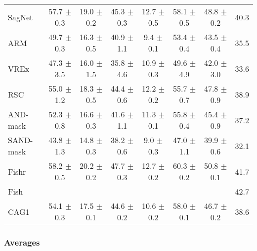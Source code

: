 \documentclass{article}
\begin{document}
\begin{center}
{\begin{tabular}{lccccccc}
SagNet               & 57.7 $\pm$ 0.3       & 19.0 $\pm$ 0.2       & 45.3 $\pm$ 0.3       & 12.7 $\pm$ 0.5       & 58.1 $\pm$ 0.5       & 48.8 $\pm$ 0.2       & 40.3                 \\
ARM                  & 49.7 $\pm$ 0.3       & 16.3 $\pm$ 0.5       & 40.9 $\pm$ 1.1       & 9.4 $\pm$ 0.1        & 53.4 $\pm$ 0.4       & 43.5 $\pm$ 0.4       & 35.5                 \\
VREx                 & 47.3 $\pm$ 3.5       & 16.0 $\pm$ 1.5       & 35.8 $\pm$ 4.6       & 10.9 $\pm$ 0.3       & 49.6 $\pm$ 4.9       & 42.0 $\pm$ 3.0       & 33.6                 \\
RSC                  & 55.0 $\pm$ 1.2       & 18.3 $\pm$ 0.5       & 44.4 $\pm$ 0.6       & 12.2 $\pm$ 0.2       & 55.7 $\pm$ 0.7       & 47.8 $\pm$ 0.9       & 38.9                 \\
AND-mask             & 52.3 $\pm$ 0.8       & 16.6 $\pm$ 0.3       & 41.6 $\pm$ 1.1       & 11.3 $\pm$ 0.1       & 55.8 $\pm$ 0.4       & 45.4 $\pm$ 0.9       & 37.2                 \\
SAND-mask            & 43.8 $\pm$ 1.3       & 14.8 $\pm$ 0.3       & 38.2 $\pm$ 0.6       & 9.0 $\pm$ 0.3        & 47.0 $\pm$ 1.1       & 39.9 $\pm$ 0.6       & 32.1                 \\
Fishr                & 58.2 $\pm$ 0.5       & 20.2 $\pm$ 0.2       & 47.7 $\pm$ 0.3       & 12.7 $\pm$ 0.2       & 60.3 $\pm$ 0.2       & 50.8 $\pm$ 0.1       & 41.7                 \\
Fish                 &                      &                      &                      &                      &                      &                      & 42.7                 \\
\midrule
CAG1                 & 54.1 $\pm$ 0.3       & 17.5 $\pm$ 0.1       & 44.6 $\pm$ 0.2       & 10.6 $\pm$ 0.2       & 58.0 $\pm$ 0.1       & 46.7 $\pm$ 0.2       & 38.6                 \\
\bottomrule
\end{tabular}}
\end{center}

\subsubsection{Averages}
\end{document}
